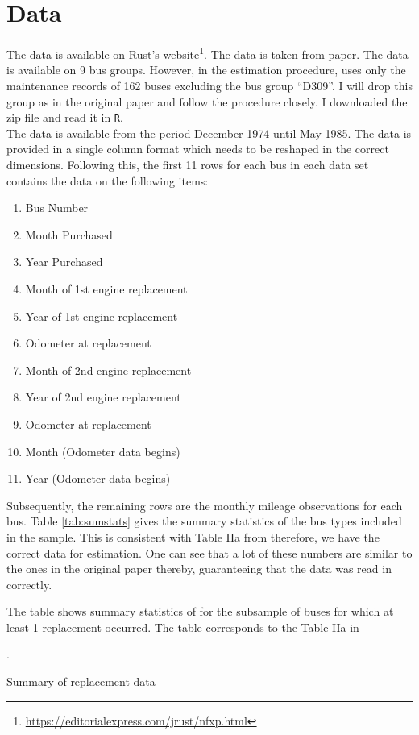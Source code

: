 \documentclass[11pt,letterpaper]{article}
\newcommand{\floatintro}[1]{
  
  \vspace*{0.1in}
  
  {\footnotesize

    #1
    
  }
  
  \vspace*{0.1in} } \newcommand{\Hline}{\noindent\rule{18cm}{0.5pt}}
\begin{document}
\section{Data}
The data is available on Rust's
website\footnote{\url{https://editorialexpress.com/jrust/nfxp.html}}. The
data is taken from \citet{rust1987optimal} paper. The data is
available on 9 bus groups. However, in the estimation procedure,
\citet{rust1987optimal} uses only the maintenance records of 162 buses
excluding the bus group ``D309''. I will drop this group as in the
original paper and follow the procedure closely. I
downloaded the zip file and read it in \texttt{R}.\\
The data is available from the period December 1974 until May
1985. The data is provided in a single column format which needs to be
reshaped in the correct dimensions. Following this, the first 11 rows
for each bus in each data set contains the data on the following
items:
\begin{enumerate}
\item Bus Number
\item Month Purchased
\item Year Purchased
\item Month of 1st engine replacement
\item Year of 1st engine replacement
\item Odometer at replacement
\item Month of 2nd engine replacement
\item Year of 2nd engine replacement
\item Odometer at replacement
\item Month (Odometer data begins)
\item Year (Odometer data begins)
\end{enumerate}
Subsequently, the remaining rows are the monthly mileage observations
for each bus. Table \ref{tab:sumstats} gives the summary statistics of
the bus types included in the sample. This is consistent with Table
IIa from \citet{rust1987optimal} therefore, we have the correct data
for estimation. One can see that a lot of these numbers are similar to
the ones in the original paper thereby, guaranteeing that the data was
read in correctly.

\begin{table}
  \floatintro{The table shows summary statistics of for the subsample
    of buses for which at least 1 replacement occurred. The table
    corresponds to the Table IIa in \citep{rust1987optimal}}. 
  \centering
  
  \caption{Summary of replacement data}
  \label{tab:sumstats}
\end{table}
\end{document}
